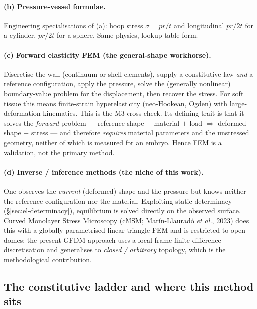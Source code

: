 \documentclass[11pt]{article}
\begin{document}
\paragraph{(b) Pressure-vessel formulae.}
Engineering specialisations of (a): hoop stress $\sigma=pr/t$ and longitudinal
$pr/2t$ for a cylinder, $pr/2t$ for a sphere.  Same physics, lookup-table form.

\paragraph{(c) Forward elasticity FEM (the general-shape workhorse).}
Discretise the wall (continuum or shell elements), supply a constitutive law
\emph{and} a reference configuration, apply the pressure, solve the (generally
nonlinear) boundary-value problem for the displacement, then recover the stress.
For soft tissue this means finite-strain hyperelasticity (neo-Hookean, Ogden)
with large-deformation kinematics.  This is the M3 cross-check.  Its defining
trait is that it solves the \emph{forward} problem — reference shape $+$ material
$+$ load $\Rightarrow$ deformed shape $+$ stress — and therefore \emph{requires}
material parameters and the unstressed geometry, neither of which is measured for
an embryo.  Hence FEM is a validation, not the primary method.

\paragraph{(d) Inverse / inference methods (the niche of this work).}
One observes the \emph{current} (deformed) shape and the pressure but knows
neither the reference configuration nor the material.  Exploiting static
determinacy (\S\ref{sec:el-determinacy}), equilibrium is solved directly on the
observed surface.  Curved Monolayer Stress Microscopy (cMSM; Mar\'in-Llaurad\'o
\textit{et al.}, 2023) does this with a globally parametrised linear-triangle FEM
and is restricted to open domes; the present GFDM approach uses a local-frame
finite-difference discretisation and generalises to \emph{closed / arbitrary}
topology, which is the methodological contribution.

\subsection{The constitutive ladder and where this method sits}
\label{sec:el-ladder}
\end{document}
